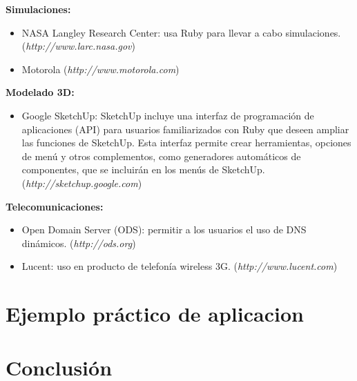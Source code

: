 \documentclass{article}
\begin{document}
\textbf{Simulaciones:}
\begin{itemize}
	\itemsep=1pt \topsep=0pt \partopsep=0pt \parskip=0pt \parsep=0pt
	\item NASA Langley Research Center: usa Ruby para llevar a cabo simulaciones. (\textit{http://www.larc.nasa.gov})
	\item Motorola (\textit{http://www.motorola.com})
\end{itemize}
\medskip

\textbf{Modelado 3D:}
\begin{itemize}
	\itemsep=1pt \topsep=0pt \partopsep=0pt \parskip=0pt \parsep=0pt
	\item Google SketchUp: SketchUp incluye una interfaz de programación de aplicaciones (API) para usuarios familiarizados con Ruby que deseen ampliar las funciones de SketchUp. Esta interfaz permite crear herramientas, opciones de menú y otros complementos, como generadores automáticos de componentes, que se incluirán en los menús de SketchUp. (\textit{http://sketchup.google.com})
\end{itemize}
\medskip

\textbf{Telecomunicaciones:}
\begin{itemize}
	\itemsep=1pt \topsep=0pt \partopsep=0pt \parskip=0pt \parsep=0pt
	\item Open Domain Server (ODS): permitir a los usuarios el uso de DNS dinámicos. (\textit{http://ods.org})
	\item Lucent: uso en producto de telefonía wireless 3G. (\textit{http://www.lucent.com})
\end{itemize}
\medskip
\bigskip




\section{Ejemplo práctico de aplicacion}

\bigskip




\section{Conclusión}
\end{document}
